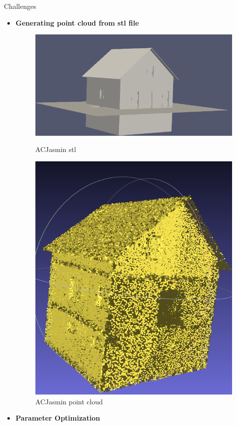 \documentclass[10pt]{beamer}
\begin{document}
\begin{frame}{Challenges}
\begin{itemize}    
    \item \textbf{Generating point cloud from stl file}
\begin{figure}[H]
        \begin{minipage}[t]{0.33\textwidth}
            \includegraphics[width=\textwidth]{../../images/screen_kinetic/ACJasmin.png}
            \caption*{ACJasmin stl}
        \end{minipage}
        \begin{minipage}[t]{0.20\textwidth}
          \includegraphics[width=\textwidth]{../../images/screen_kinetic/ACJasmin_point_cloud.png}
          \caption*{ACJasmin point cloud}
        \end{minipage}
\end{figure}
    \item \textbf{Parameter Optimization}
\end{itemize}
\end{frame}
\end{document}
